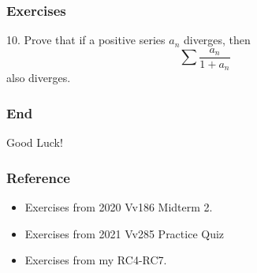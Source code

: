 \documentclass{beamer}
\begin{document}
\begin{frame}
    \frametitle{Exercises}
    \hspace{1em}
    10. Prove that if a positive series $a_n$ diverges, then 
    $$\sum \frac{a_n}{1+a_n}$$
    also diverges.
    

\end{frame}
\begin{frame}
    \frametitle{End}
    \centering
    \LARGE{Good Luck!}

\end{frame}
\begin{frame}
    \frametitle{Reference}
    \begin{itemize}
        \item Exercises from 2020 Vv186 Midterm 2.
        \item Exercises from 2021 Vv285 Practice Quiz
        \item Exercises from my RC4-RC7.
     \end{itemize}
\end{frame}
\end{document}

